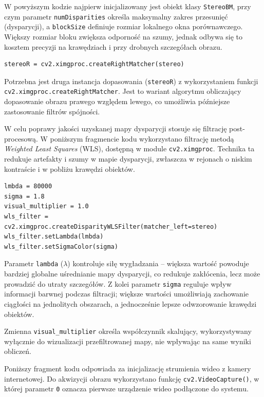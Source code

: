 \documentclass[magisterska]{pracadypl}
\begin{document}
W powyższym kodzie najpierw inicjalizowany jest obiekt klasy \texttt{StereoBM}, przy czym parametr \texttt{numDisparities} określa maksymalny zakres przesunięć (dysparycji), a \texttt{blockSize} definiuje rozmiar lokalnego okna porównawczego. Większy rozmiar bloku zwiększa odporność na szumy, jednak odbywa się to kosztem precyzji na krawędziach i przy drobnych szczegółach obrazu.  

\begin{lstlisting}[style=mypython]
stereoR = cv2.ximgproc.createRightMatcher(stereo)
\end{lstlisting}

Potrzebna jest druga instancja dopasowania (\texttt{stereoR}) z wykorzystaniem funkcji \texttt{cv2.ximgproc.createRightMatcher}. Jest to wariant algorytmu obliczający dopasowanie obrazu prawego względem lewego, co umożliwia późniejsze zastosowanie filtrów spójności. 

W celu poprawy jakości uzyskanej mapy dysparycji stosuje się filtrację post-procesową. W poniższym fragmencie kodu wykorzystano filtrację metodą \textit{Weighted Least Squares} (WLS), dostępną w module \texttt{cv2.ximgproc}. Technika ta redukuje artefakty i szumy w mapie dysparycji, zwłaszcza w rejonach o niskim kontraście i w pobliżu krawędzi obiektów.  

\begin{lstlisting}[style=mypython]
lmbda = 80000
sigma = 1.8
visual_multiplier = 1.0
wls_filter = cv2.ximgproc.createDisparityWLSFilter(matcher_left=stereo)
wls_filter.setLambda(lmbda)
wls_filter.setSigmaColor(sigma)
\end{lstlisting}

Parametr \texttt{lambda} (\( \lambda \)) kontroluje siłę wygładzania – większa wartość powoduje bardziej globalne uśrednianie mapy dysparycji, co redukuje zakłócenia, lecz może prowadzić do utraty szczegółów. Z kolei parametr \texttt{sigma} reguluje wpływ informacji barwnej podczas filtracji; większe wartości umożliwiają zachowanie ciągłości na jednolitych obszarach, a jednocześnie lepsze odwzorowanie krawędzi obiektów.  

Zmienna \texttt{visual\_multiplier} określa współczynnik skalujący, wykorzystywany wyłącznie do wizualizacji przefiltrowanej mapy, nie wpływając na same wyniki obliczeń.  

Poniższy fragment kodu odpowiada za inicjalizację strumienia wideo z kamery internetowej. Do akwizycji obrazu wykorzystano funkcję \texttt{cv2.VideoCapture()}, w której parametr \texttt{0} oznacza pierwsze urządzenie wideo podłączone do systemu.  
\end{document}
